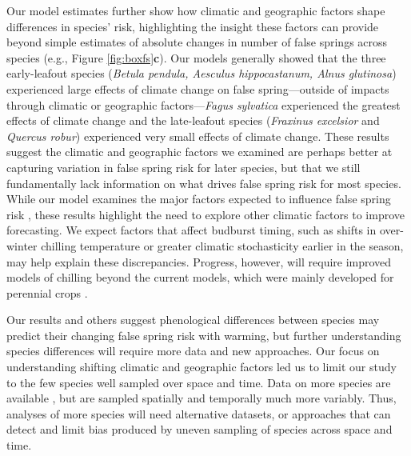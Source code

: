 \documentclass{article}\usepackage[]{graphicx}\usepackage[]{color}
\begin{document}
Our model estimates further show how climatic and geographic factors shape differences in species' risk, highlighting the insight these factors can provide beyond simple estimates of absolute changes in number of false springs across species (e.g., Figure \ref{fig:boxfs}\textbf{c}). Our models generally showed that the three early-leafout species (\textit{Betula pendula, Aesculus hippocastanum, Alnus glutinosa}) experienced large effects of climate change on false spring---outside of impacts through climatic or geographic factors---\textit{Fagus sylvatica} experienced the greatest effects of climate change and the late-leafout species (\textit{Fraxinus excelsior} and \textit{Quercus robur}) experienced very small effects of climate change. These results suggest the climatic and geographic factors we examined are perhaps better at capturing variation in false spring risk for later species, but that we still fundamentally lack information on what drives false spring risk for most species. While our model examines the major factors expected to influence false spring risk \citep{Wypych2016a,Liu2018,Ma2018,Vitasse2018}, these results highlight the need to explore other climatic factors to improve forecasting. We expect factors that affect budburst timing, such as shifts in over-winter chilling temperature or greater climatic stochasticity earlier in the season, may help explain these discrepancies. Progress, however, will require improved models of chilling beyond the current models, which were mainly developed for perennial crops \citep{Dennis2003,Luedeling2011}. 

Our results and others \citep{Ma2018} suggest phenological differences between species may predict their changing false spring risk with warming, but further understanding species differences will require more data and new approaches. Our focus on understanding shifting climatic and geographic factors led us to limit our study to the few species well sampled over space and time. Data on more species are available \citep[e.g.,][]{Ma2018}, but are sampled spatially and temporally much more variably. Thus, analyses of more species will need alternative datasets, or approaches that can detect and limit bias produced by uneven sampling of species across space and time.
\end{document}
